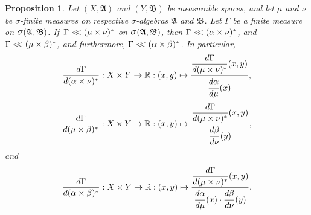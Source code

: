 \documentclass[
twoside=true,
paper=letter,
fontsize=9pt,
pagesize=auto,
leqno,
openany,
headsepline,
overfullrule,
]{scrbook}
\theoremstyle{plain}
\theoremstyle{plain}
\newtheorem{prop}[thm]{Proposition}
\theoremstyle{definition}
\theoremstyle{bfnoteitalic}
\theoremstyle{bfnoteroman}
\newcommand{\sigalg}[1]{\mathfrak{#1}}
\newcommand{\sagb}{\mathop{\hbox{\large{$\sigma$}}}\nolimits}
\newcommand{\textsigma}{\hbox{\large{$\sigma$}}\kern-1pt}
\newcommand{\R}{\mathbb{R}}
\newcommand{\sigmaalgebra}{\sigalg{A}}
\newcommand{\sigmaalgebraii}{\sigalg{B}}
\newcommand{\productsig}[2]{\sagb(#1,#2)}
\newcommand{\lilstrut}{\vphantom{\bigl(}}
\newcommand{\measurespace}{X}
\newcommand{\measurespaceii}{Y}
\newcommand{\mspaceelt}{x}
\newcommand{\mspaceeltii}{y}
\newcommand{\abscont}{\mathrel{< \kern-3.5pt <}}
\newcommand{\measure}{\mu}
\newcommand{\measmu}{\mu}
\newcommand{\measureii}{\nu}
\newcommand{\measnu}{\nu}
\newcommand{\joint}{\Gamma}%
\newcommand{\measonprod}{\Gamma}%
\newcommand{\marginalone}{\alpha}%
\newcommand{\marginaltwo}{\beta}%
\begin{document}
\begin{prop}\label{joint_abscont}
Let
$(\measurespace, \sigmaalgebra)$
and
$(\measurespaceii, \sigmaalgebraii)$
be measurable spaces, and let $\measure$ and $\measureii$
be \textsigma-finite measures on  respective \textsigma-algebras
$\sigmaalgebra$ and $\sigmaalgebraii$.
Let $\measonprod$ be a finite measure on
$\productsig{\sigmaalgebra}{\sigmaalgebraii}$.
If\,
$\measonprod \abscont (\measure\times\measureii)^*$
on
$\productsig{\sigmaalgebra}{\sigmaalgebraii}$,
then 
$\measonprod \abscont (\marginalone\times\measureii)^*$,
and
$\measonprod \abscont (\measure\times\marginaltwo)^*$,
and furthermore,
$\measonprod \abscont (\marginalone\times\marginaltwo)^*$.
In particular,
\[
\frac{d\measonprod}{d(\marginalone\times\measnu)^*}
: \measurespace\times\measurespaceii
\to \R
: (\mspaceelt,\mspaceeltii)\mapsto
\frac{\dfrac{d\joint}{d(\measmu\times\measnu)^*}
(\mspaceelt,\mspaceeltii)}
{\dfrac{d\marginalone\lilstrut}{d\measmu}(\mspaceelt)},
\]
\[
\frac{d\measonprod}{d(\measmu\times\marginaltwo)^*}
: \measurespace\times\measurespaceii
\to \R
: (\mspaceelt,\mspaceeltii)\mapsto
\frac{\dfrac{d\joint}{d(\measmu\times\measnu)^*}
(\mspaceelt,\mspaceeltii)}
{\dfrac{d\marginaltwo\lilstrut}{d\measnu}(\mspaceeltii)},
\]
and
\[
\frac{d\measonprod}{d(\marginalone\times\marginaltwo)^*}
: \measurespace\times\measurespaceii
\to \R
: (\mspaceelt,\mspaceeltii)\mapsto
\frac{\dfrac{d\joint}{d(\measmu\times\measnu)^*}
(\mspaceelt,\mspaceeltii)}
{\dfrac{d\marginalone\lilstrut}{d\measmu}(\mspaceelt)
\cdot
\dfrac{d\marginaltwo\lilstrut}{d\measnu}(\mspaceeltii)}.
\]
\end{prop}
\end{document}
